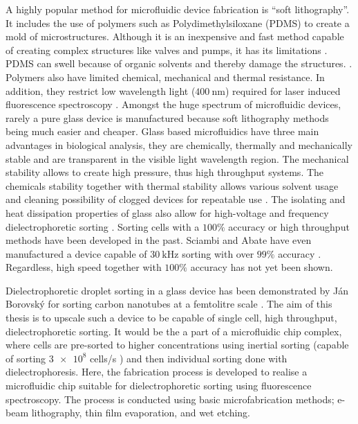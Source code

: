\documentclass[final]{jyflluk}
\begin{document}
A highly popular method for microfluidic device fabrication is “soft lithography”. It includes the use of polymers such as Polydimethylsiloxane (PDMS) to create a mold of microstructures. Although it is an inexpensive and fast method capable of creating complex structures like valves and pumps, it has its limitations \cite{pethig_review_2010,xia_soft_1998,tian2008introduction, grover_monolithic_2003}. PDMS can swell because of organic solvents and thereby damage the structures. \cite{lee_solvent_2003}. Polymers also have limited chemical, mechanical and thermal resistance. In addition, they restrict low wavelength light ($\SI{400}{\nano \metre}$) required for laser induced fluorescence spectroscopy \cite{tian2008introduction,stankova_optical_2016}. Amongst the huge spectrum of microfluidic devices, rarely a pure glass device is manufactured because soft lithography methods being much easier and cheaper. Glass based microfluidics have three main advantages in biological analysis, they are chemically, thermally and mechanically stable and are transparent in the visible light wavelength region. The mechanical stability allows to create high pressure, thus high throughput systems. The chemicals stability together with thermal stability allows various solvent usage and cleaning possibility of clogged devices for repeatable use \cite{ofner_high-throughput_2017}. The isolating and heat dissipation properties of glass also allow for high-voltage and frequency dielectrophoretic sorting \cite{effenhauser_high-speed_1994}.
Sorting cells with a $100 \percent$ accuracy \cite{takahashi_non-destructive_2004, thomas_imagebased_2019} or high throughput methods \cite{zhang_towards_2015} have been developed in the past. Sciambi and Abate have even manufactured a device capable of $\SI{30}{\kilo \Hz}$ sorting with over $99 \percent$ accuracy \cite{sciambi2015accurate}. Regardless, high speed together with $100\percent$ accuracy has not yet been shown.

Dielectrophoretic droplet sorting in a glass device has been demonstrated by Ján Borovský for sorting carbon nanotubes at a femtolitre scale \cite{borovsky}. The aim of this thesis is to upscale such a device to be capable of single cell, high throughput, dielectrophoretic sorting. It would be the a part of a microfluidic chip complex, where cells are pre-sorted to higher concentrations using inertial sorting (capable of sorting $\num{3e8}$ cells/s \cite{edd_microfluidic_2020}) and then individual sorting done with dielectrophoresis. Here, the fabrication process  is developed to realise a microfluidic chip suitable for dielectrophoretic sorting using fluorescence spectroscopy. The process is conducted using basic microfabrication methods; e-beam lithography, thin film evaporation, and wet etching.
\end{document}
